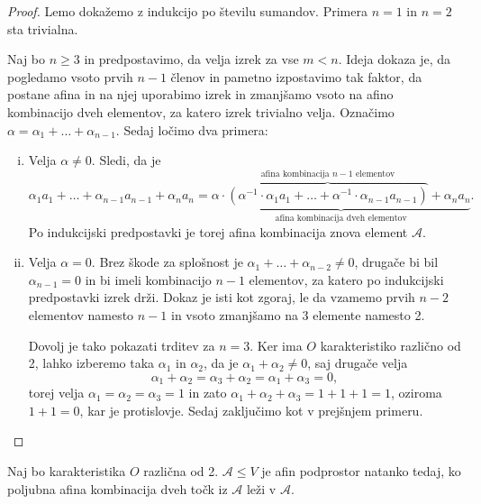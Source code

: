 \begin{proof}
    Lemo dokažemo z indukcijo po številu sumandov. Primera $n = 1$ in $n = 2$ sta trivialna.
    
    Naj bo $n \geq 3$ in predpostavimo, da velja izrek za vse $m < n$. Ideja dokaza je, da pogledamo vsoto prvih $n - 1$ členov in pametno izpostavimo tak faktor, da postane afina in na njej uporabimo izrek
    in zmanjšamo vsoto na afino kombinacijo dveh elementov, za katero izrek trivialno velja.
    Označimo $\alpha = \alpha_1 + \dots + \alpha_{n-1}$. Sedaj ločimo dva primera:
   
    \begin{enumerate}[i)]
    \item Velja $\alpha \neq 0.$ Sledi, da je
    \[
        \alpha_1 a_1 + \dots + \alpha_{n-1} a_{n-1} + \alpha_n a_n = 
        \underbrace{\alpha \cdot \overbrace{(\alpha^{-1} \cdot \alpha_1 a_1 + \dots + \alpha^{-1} \cdot \alpha_{n-1} a_{n-1})}^{\text{afina kombinacija $n - 1$ elementov}} + \alpha_n a_n}_{\text{afina kombinacija dveh elementov}}.
    \]
    Po indukcijski predpostavki je torej afina kombinacija znova element $\mathcal{A}$.
    \item Velja $\alpha = 0$.
    Brez škode za splošnost je $\alpha_1 + \dots + \alpha_{n-2} \neq 0$, drugače bi bil $\alpha_{n-1} = 0$ in bi imeli kombinacijo $n-1$ elementov, za katero po indukcijski predpostavki izrek drži.
    Dokaz je isti kot zgoraj, le da vzamemo prvih $n-2$ elementov namesto $n-1$ in vsoto zmanjšamo na 3 elemente namesto 2. 
    
    Dovolj je tako pokazati trditev za $n=3$. Ker ima $O$ karakteristiko različno od 2, lahko izberemo taka $\alpha_1$ in $\alpha_2$, da je $\alpha_1 + \alpha_2 \neq 0$,
    saj drugače velja
    \[
    \alpha_1 + \alpha_2 = \alpha_3 + \alpha_2 = \alpha_1 + \alpha_3 = 0,
    \]
    torej velja $\alpha_1 = \alpha_2 = \alpha_3 = 1$ in zato $\alpha_1 + \alpha_2 + \alpha_3 = 1 + 1 + 1 = 1$, oziroma $1 + 1 = 0$, kar je protislovje. Sedaj zaključimo kot v prejšnjem primeru. \qedhere
    \end{enumerate}
\end{proof}

\begin{trditev}
    Naj bo karakteristika $O$ različna od 2. $\mathcal{A} \leq V$ je afin podprostor natanko tedaj, ko poljubna afina kombinacija dveh točk iz $\mathcal{A}$ leži v $\mathcal{A}$.
\end{trditev}

